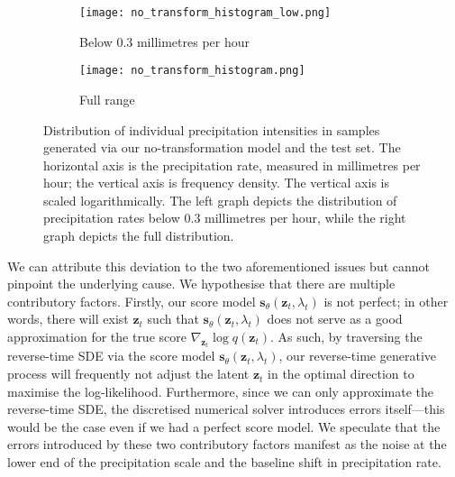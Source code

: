\documentclass[ oneside,%
                    author={George Herbert},
                    degree={MSci},
                     title={Video Diffusion Models for Climate Simulations},
                  subtitle={}]{dissertation}
\begin{document}
\begin{figure}[htbp]
      \centering
      \begin{subfigure}{0.49\textwidth}
            \texttt{[image: no\_transform\_histogram\_low.png]}
            \caption{Below 0.3 millimetres per hour}
            \label{fig:no_transform_histogram_low}
      \end{subfigure}
      \begin{subfigure}{0.49\textwidth}
            \texttt{[image: no\_transform\_histogram.png]}
            \caption{Full range}
            \label{fig:no_transform_histogram_high}
      \end{subfigure}
      \caption{Distribution of individual precipitation intensities in samples generated via our no-transformation model and the test set. The horizontal axis is the precipitation rate, measured in millimetres per hour; the vertical axis is frequency density. The vertical axis is scaled logarithmically. The left graph depicts the distribution of precipitation rates below 0.3 millimetres per hour, while the right graph depicts the full distribution.}
      \label{fig:no_transform_histogram}
\end{figure}

We can attribute this deviation to the two aforementioned issues but cannot pinpoint the underlying cause. We hypothesise that there are multiple contributory factors. Firstly, our score model $\mathbf{s}_\theta(\mathbf{z}_t, \lambda_t)$ is not perfect; in other words, there will exist $\mathbf{z}_t$ such that $\mathbf{s}_\theta(\mathbf{z}_t, \lambda_t)$ does not serve as a good approximation for the true score $\nabla_{\mathbf{z}_t}  \log q(\mathbf{z}_t)$. As such, by traversing the reverse-time SDE via the score model $\mathbf{s}_\theta(\mathbf{z}_t,\lambda_t)$, our reverse-time generative process will frequently not adjust the latent $\mathbf{z}_t$ in the optimal direction to maximise the log-likelihood. Furthermore, since we can only approximate the reverse-time SDE, the discretised numerical solver introduces errors itself---this would be the case even if we had a perfect score model. We speculate that the errors introduced by these two contributory factors manifest as the noise at the lower end of the precipitation scale and the baseline shift in precipitation rate.
\end{document}
